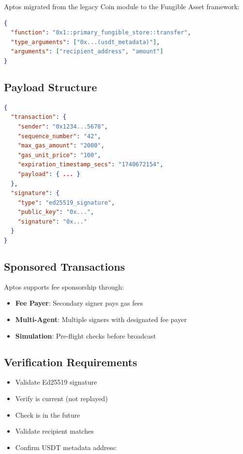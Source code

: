 Aptos migrated from the legacy Coin module to the Fungible Asset framework:

\begin{lstlisting}[language=json,caption={Aptos transfer entry function}]
{
  "function": "0x1::primary_fungible_store::transfer",
  "type_arguments": ["0x...(usdt_metadata)"],
  "arguments": ["recipient_address", "amount"]
}
\end{lstlisting}

\subsection{Payload Structure}

\begin{lstlisting}[language=json,caption={Aptos exact scheme payload}]
{
  "transaction": {
    "sender": "0x1234...5678",
    "sequence_number": "42",
    "max_gas_amount": "2000",
    "gas_unit_price": "100",
    "expiration_timestamp_secs": "1740672154",
    "payload": { ... }
  },
  "signature": {
    "type": "ed25519_signature",
    "public_key": "0x...",
    "signature": "0x..."
  }
}
\end{lstlisting}

\subsection{Sponsored Transactions}

Aptos supports fee sponsorship through:

\begin{itemize}
    \item \textbf{Fee Payer}: Secondary signer pays gas fees
    \item \textbf{Multi-Agent}: Multiple signers with designated fee payer
    \item \textbf{Simulation}: Pre-flight checks before broadcast
\end{itemize}

\subsection{Verification Requirements}

\begin{itemize}
    \item Validate Ed25519 signature
    \item Verify  is current (not replayed)
    \item Check  is in the future
    \item Validate recipient matches 
    \item Confirm USDT metadata address: 
\end{itemize}

